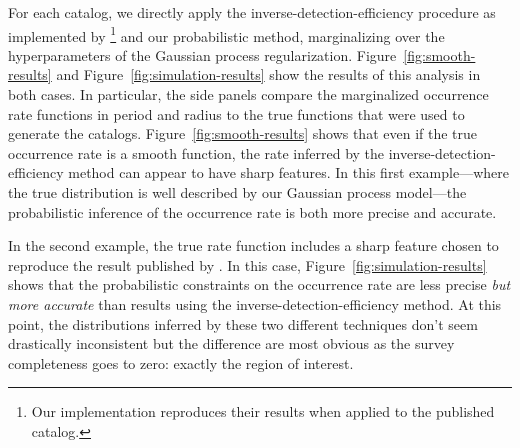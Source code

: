 \documentclass[12pt,preprint]{aastex}
\newcommand{\Fig}[1]{Figure~\ref{fig:#1}}
\newcommand{\fig}[1]{\Fig{#1}}
\begin{document}
For each catalog, we directly apply the inverse-detection-efficiency procedure
as implemented by \citealt{petigura}\footnote{Our implementation reproduces
their results when applied to the published catalog.} and our probabilistic
method, marginalizing over the hyperparameters of the Gaussian process
regularization.
\Fig{smooth-results} and \fig{simulation-results} show the results of this
analysis in both cases.
In particular, the side panels compare the marginalized occurrence rate
functions in period and radius to the true functions that were used to
generate the catalogs.
\Fig{smooth-results} shows that even if the true occurrence rate is a smooth
function, the rate inferred by the inverse-detection-efficiency method can
appear to have sharp features.
In this first example---where the true distribution is well described by our
Gaussian process model---the probabilistic inference of the occurrence rate is
both more precise and accurate.

In the second example, the true rate function includes a sharp feature chosen
to reproduce the result published by \citet{petigura}.
In this case, \fig{simulation-results} shows that the probabilistic
constraints on the occurrence rate are less precise \emph{but more accurate}
than results using the inverse-detection-efficiency method.
At this point, the distributions inferred by these two different techniques
don't seem drastically inconsistent but the difference are most obvious as the
survey completeness goes to zero: exactly the region of interest.
\end{document}
